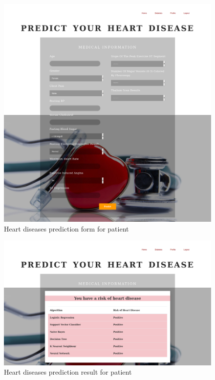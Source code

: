 \documentclass[oneside,12pt]{Classes/VTU}
\begin{document}
    			\begin{figure}
    				\begin{center}
    				\includegraphics[width=17cm]{Screenshots/heart-form.PNG}
    				\caption{Heart diseases prediction form for patient}
    				\end{center}
    			\end{figure}
    			
    			\begin{figure}
    				\begin{center}
    				\includegraphics[width=17cm]{Screenshots/heart-result.PNG}
    				\caption{Heart diseases prediction result for patient}
    				\end{center}
    			\end{figure}
    			
\end{document}

